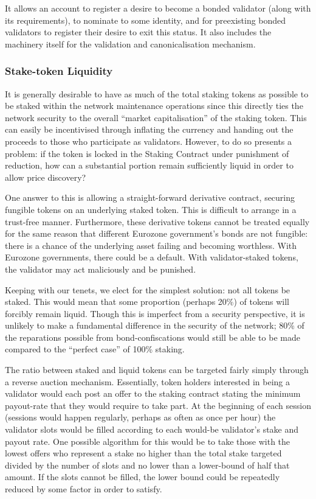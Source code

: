 \documentclass[9pt,oneside]{amsart}
\begin{document}
\begin{multicols}{2}
 It allows an account to register a desire to become a bonded validator (along with its requirements), to nominate to some identity, and for preexisting bonded validators to register their desire to exit this status. It also includes the machinery itself for the validation and canonicalisation mechanism.

\subsubsection{Stake-token Liquidity}
\label{stake-token-liquidity}

 It is generally desirable to have as much of the total staking tokens as possible to be staked within the network maintenance operations since this directly ties the network security to the overall ``market capitalisation'' of the staking token. This can easily be incentivised through inflating the currency and handing out the proceeds to those who participate as validators. However, to do so presents a problem: if the token is locked in the Staking Contract under punishment of reduction, how can a substantial portion remain sufficiently liquid in order to allow price discovery?

 One answer to this is allowing a straight-forward derivative contract, securing fungible tokens on an underlying staked token. This is difficult to arrange in a trust-free manner. Furthermore, these derivative tokens cannot be treated equally for the same reason that different Eurozone government's bonds are not fungible: there is a chance of the underlying asset failing and becoming worthless. With Eurozone governments, there could be a default. With validator-staked tokens, the validator may act maliciously and be punished.

 Keeping with our tenets, we elect for the simplest solution: not all tokens be staked. This would mean that some proportion (perhaps 20\%) of tokens will forcibly remain liquid. Though this is imperfect from a security perspective, it is unlikely to make a fundamental difference in the security of the network; 80\% of the reparations possible from bond-confiscations would still be able to be made compared to the ``perfect case'' of 100\% staking.

 The ratio between staked and liquid tokens can be targeted fairly simply through a reverse auction mechanism. Essentially, token holders interested in being a validator would each post an offer to the staking contract stating the minimum payout-rate that they would require to take part. At the beginning of each session (sessions would happen regularly, perhaps as often as once per hour) the validator slots would be filled according to each would-be validator's stake and payout rate. One possible algorithm for this would be to take those with the lowest offers who represent a stake no higher than the total stake targeted divided by the number of slots and no lower than a lower-bound of half that amount. If the slots cannot be filled, the lower bound could be repeatedly reduced by some factor in order to satisfy.


\end{multicols}
\end{document}
